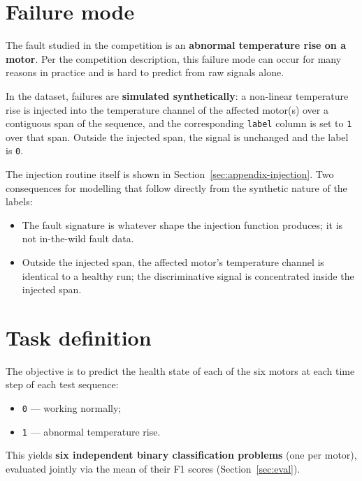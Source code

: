 \documentclass[11pt,a4paper]{article}
\begin{document}
\section{Failure mode}
\label{sec:failure}

The fault studied in the competition is an \textbf{abnormal temperature rise on
a motor}. Per the competition description, this failure mode can occur for many
reasons in practice and is hard to predict from raw signals alone.

In the dataset, failures are \textbf{simulated synthetically}: a non-linear
temperature rise is injected into the temperature channel of the affected
motor(s) over a contiguous span of the sequence, and the corresponding
\texttt{label} column is set to \texttt{1} over that span. Outside the injected
span, the signal is unchanged and the label is \texttt{0}.

The injection routine itself is shown in Section~\ref{sec:appendix-injection}.
Two consequences for modelling that follow directly from the synthetic nature
of the labels:

\begin{itemize}[leftmargin=1.4em]
  \item The fault signature is whatever shape the injection function produces;
        it is not in-the-wild fault data.
  \item Outside the injected span, the affected motor's temperature channel is
        identical to a healthy run; the discriminative signal is concentrated
        inside the injected span.
\end{itemize}

\section{Task definition}
\label{sec:task}

The objective is to predict the health state of each of the six motors at each
time step of each test sequence:

\begin{itemize}[leftmargin=1.4em]
  \item \texttt{0} --- working normally;
  \item \texttt{1} --- abnormal temperature rise.
\end{itemize}

This yields \textbf{six independent binary classification problems} (one per
motor), evaluated jointly via the mean of their F1 scores
(Section~\ref{sec:eval}).
\end{document}
